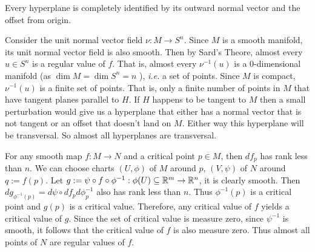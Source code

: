 \documentclass[12pt]{article}
\begin{document}
\begin{problem}[10.3]
Every hyperplane is completely identified by its outward normal vector and the offset from origin.

Consider the unit normal vector field  $ \nu:M \to S^{n}$. Since $ M$ is a smooth manifold, its unit normal vector field is also smooth. Then by Sard's Theore, almost every  $ u \in S^{n}$ is a regular value of $ f$. That is, almost every $ \nu^{-1}(u)$ is a 0-dimensional manifold (as $ \dim M = \dim S^{n} =n$ ), \emph{i.e.} a set of points. Since $ M$ is compact,  $ \nu^{-1}(u)$ is a finite set of points. That is, only a finite number of points in $ M$ that have tangent planes parallel to  $ H$. If  $ H$ happens to be tangent to $ M$ then a small perturbation would give us a hyperplane that either has a normal vector that is not tangent or an offset that doesn't land on  $ M$. Either way  this hyperplane will be transversal. So almost all hyperplanes are transversal.
\end{problem}

\begin{problem}[10.5]
For any smooth map $ f: M \to N$ and a critical point $ p \in M$, then $ df_p$ has rank less than $ n$. We can choose charts $ (U, \phi)$ of $ M$ around $ p$,  $ (V,\psi)$ of $ N$ around $ q:=f(p)$. Let $ g:= \psi \circ f \circ \phi ^{-1}: \phi (U) \subseteq \mathbb{R}^{m} \to \mathbb{R}^{n}$, it is clearly smooth. Then $ dg_{\phi ^{-1}(p)} = d \psi \circ df_p d \phi ^{-1}_p$ also has rank less than $ n$. Thus $ \phi ^{-1}(p)$ is a critical point and $ g(p)$ is a critical value. Therefore, any critical value of $ f$ yields a critical value of  $ g$. Since the set of critical value is measure zero, since $ \psi ^{-1}$ is smooth, it follows that the critical value of $ f$ is also measure zero. Thus almost all points of $ N$ are regular values of $ f$.
\end{problem}
\end{document}
